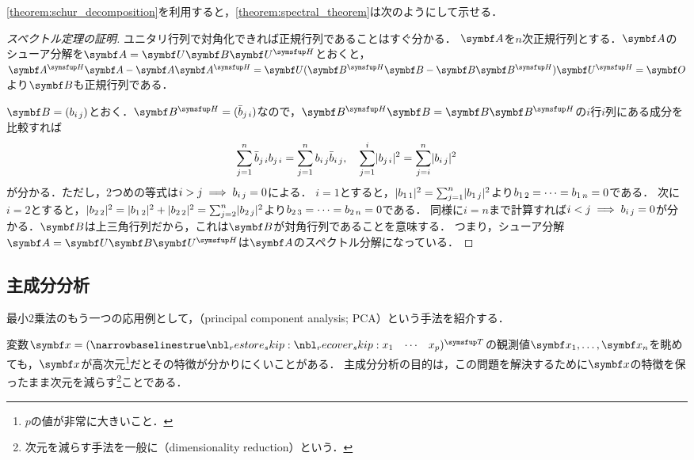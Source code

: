 \documentclass[../../main]{subfiles}
\begin{document}
\cref{theorem:schur_decomposition}を利用すると，\cref{theorem:spectral_theorem}は次のようにして示せる．

\begin{proof}[スペクトル定理の証明]
  ユニタリ行列で対角化できれば正規行列であることはすぐ分かる．
  \(\mat{A}\)を\(n\)次正規行列とする．\(\mat{A}\)のシューア分解を\(\mat{A}=\mat{U}\mat{B}\htrps{\mat{U}}\)とおくと，
  \(\htrps{\mat{A}}\mat{A}-\mat{A}\htrps{\mat{A}}=\mat{U}(\htrps{\mat{B}}\mat{B}-\mat{B}\htrps{\mat{B}})\htrps{\mat{U}}=\zmat\)より\(\mat{B}\)も正規行列である．

  \(\mat{B}=\matfence{\midx{b}{i}{j}}\)とおく．\(\htrps{\mat{B}}=\matfence{\midx{\conj{b}}{j}{i}}\)なので，\(\htrps{\mat{B}}\mat{B}=\mat{B}\htrps{\mat{B}}\)の\(i\)行\(i\)列にある成分を比較すれば
  \[
    \sum_{j=1}^n\midx{\conj{b}}{j}{i}\midx{b}{j}{i} = \sum_{j=1}^n\midx{b}{i}{j}\midx{\conj{b}}{i}{j},
    \quad\sum_{j=1}^i\abs{\midx{b}{j}{i}}^2 = \sum_{j=i}^n\abs{\midx{b}{i}{j}}^2
  \]
  が分かる．ただし，2つめの等式は\(i>j\implies b_{i\,j}=0\)による．
  \(i=1\)とすると，\(\lvert b_{1\,1}\rvert^2=\sum_{j=1}^n\lvert b_{1\,j}\rvert^2\)より\(b_{1\,2}=\dots=b_{1\,n}=0\)である．
  次に\(i=2\)とすると，\(\lvert b_{2\,2}\rvert^2=\lvert b_{1\,2}\rvert^2+\lvert b_{2\,2}\rvert^2=\sum_{j=2}^n\lvert b_{2\,j}\rvert^2\)より\(b_{2\,3}=\dots=b_{2\,n}=0\)である．
  同様に\(i=n\)まで計算すれば\(i<j\implies b_{i\,j}=0\)が分かる．\(\mat{B}\)は上三角行列だから，これは\(\mat{B}\)が対角行列であることを意味する．
  つまり，シューア分解\(\mat{A}=\mat{U}\mat{B}\htrps{\mat{U}}\)は\(\mat{A}\)のスペクトル分解になっている．
\end{proof}

\subsection{主成分分析}

最小2乗法のもう一つの応用例として，（principal component analysis; PCA）という手法を紹介する．

変数\(\vect{x}=\trps{\rowvect{x_1 & \cdots & x_p}}\)の観測値\(\vect{x}_1,\dots,\vect{x}_n\)を眺めても，\(\vect{x}\)が高次元\footnote{\(p\)の値が非常に大きいこと．}だとその特徴が分かりにくいことがある．
主成分分析の目的は，この問題を解決するために\(\vect{x}\)の特徴を保ったまま次元を減らす\footnote{次元を減らす手法を一般に（dimensionality reduction）という．}ことである．
\end{document}
